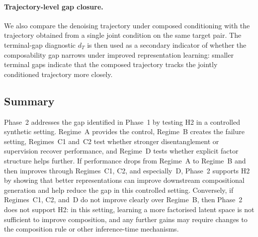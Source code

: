 
\paragraph{Trajectory-level gap closure.}
We also compare the denoising trajectory under composed
conditioning with the trajectory obtained from a single joint condition on the same target pair. The
terminal-gap diagnostic $d_T$ is then used as a secondary indicator of whether the
composability gap narrows under improved representation learning: smaller terminal gaps indicate
that the composed trajectory tracks the jointly conditioned trajectory more closely.

\subsection{Summary}
\label{subsec:p2_bridge}

Phase~2 addresses the gap identified in Phase~1 by testing H2 in a controlled synthetic setting.
Regime~A provides the control, Regime~B creates the failure setting, Regimes~C1 and~C2 test
whether stronger disentanglement or supervision recover performance, and Regime~D tests whether
explicit factor structure helps further. If performance drops from Regime~A to Regime~B and then
improves through Regimes~C1, C2, and especially~D, Phase~2 supports H2 by showing that better
representations can improve downstream compositional generation and help reduce the gap in this
controlled setting. Conversely, if Regimes~C1, C2, and~D do not improve clearly over Regime~B, then Phase~2 does not support H2: in this setting, learning a more factorised latent space is not sufficient to improve composition, and any further gains may require changes to the composition rule or other inference-time mechanisms.

